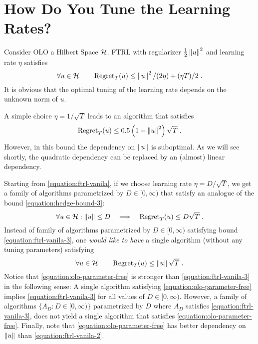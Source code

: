 \section{How Do You Tune the Learning Rates?}
\label{sec:learning_rates}
Consider \ac{OLO} a Hilbert Space $\mathcal{H}$. \ac{FTRL} with regularizer
$\tfrac{1}{2}\left\|{u}\right\|^2$ and learning rate $\eta$ satisfies ~\cite{}
\begin{equation}
\label{equation:ftrl-vanila}
\forall u \in \mathcal{H} \qquad \operatorname{Regret}_T(u) \le \left\|{u}\right\|^2/(2\eta) + (\eta T)/2 \; .
\end{equation}
It is obvious that the optimal tuning of the learning rate depends on the unknown norm of $u$.

A simple choice $\eta = 1/\sqrt{T}$ leads to an algorithm that satisfies
\begin{equation}
\label{equation:ftrl-vanila-2}
\operatorname{Regret}_T(u) \le 0.5\left(1+\left\|{u}\right\|^2\right)\sqrt{T} \; .
\end{equation}
However, in this bound the dependency on $\left\|{u}\right\|$ is suboptimal. As we will see shortly, the quadratic dependency can be replaced by an (almost) linear dependency.

Starting from \eqref{equation:ftrl-vanila}, if we choose learning rate $\eta =
D/\sqrt{T}$, we get a family of algorithms parametrized by $D \in [0,\infty)$
that satisfy an analogue of the bound \eqref{equation:hedge-bound-3}:
\begin{equation}
\label{equation:ftrl-vanila-3}
\forall u \in \mathcal{H} : \left\|{u}\right\| \le D \quad  \Longrightarrow \quad \operatorname{Regret}_T(u) \le D \sqrt{T} \; .
\end{equation}
Instead of family of algorithms parametrized by $D \in [0,\infty)$ satisfying
bound \eqref{equation:ftrl-vanila-3}, one \emph{would like
to have} a single algorithm (without any tuning parameters) satisfying
\begin{equation}
\label{equation:olo-parameter-free}
\forall u \in \mathcal{H} \qquad \operatorname{Regret}_T(u) \le \left\|{u}\right\| \sqrt{T} \; .
\end{equation}
Notice that \eqref{equation:olo-parameter-free} is stronger than
\eqref{equation:ftrl-vanila-3} in the following sense: A single algorithm
satisfying \eqref{equation:olo-parameter-free} implies
\eqref{equation:ftrl-vanila-3} for all values of $D \in [0,\infty)$. However,
a family of algorithms $\{A_D : D \in [0,\infty)\}$ parametrized by $D$ where
$A_D$ satisfies \eqref{equation:ftrl-vanila-3}, does not yield a single
algorithm that satisfies \eqref{equation:olo-parameter-free}.  Finally, note
that \eqref{equation:olo-parameter-free} has better dependency on $\left\|{u}\right\|$
than \eqref{equation:ftrl-vanila-2}.

